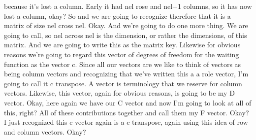 \documentclass[10pt]{article}
\begin{document}
because it's lost a column. Early it had nel rose and nel+1 columns, so it has now lost a column, okay? So and we are going to recognize therefore that it is a matrix of size nel cross nel. Okay. And we're going to do one more thing. We are going to call, so nel across nel is the dimension, or rather the dimensions, of this matrix. And we are going to write this as the matrix key. Likewise for obvious reasons we're going to regard this vector of degrees of freedom for the waiting function as the vector c. Since all our vectors are we like to think of vectors as being column vectors and recognizing that we've written this a a role vector, I'm going to call it c transpose. A vector is terminology that we reserve for column vectors. Likewise, this vector, again for obvious reasons, is going to be my D vector. Okay, here again we have our C vector and now I'm going to look at all of this, right? All of these contributions together and call them my F vector. Okay? I just recognized this c vector again is a c transpose, again using this idea of row and column vectors. Okay?
\end{document}
